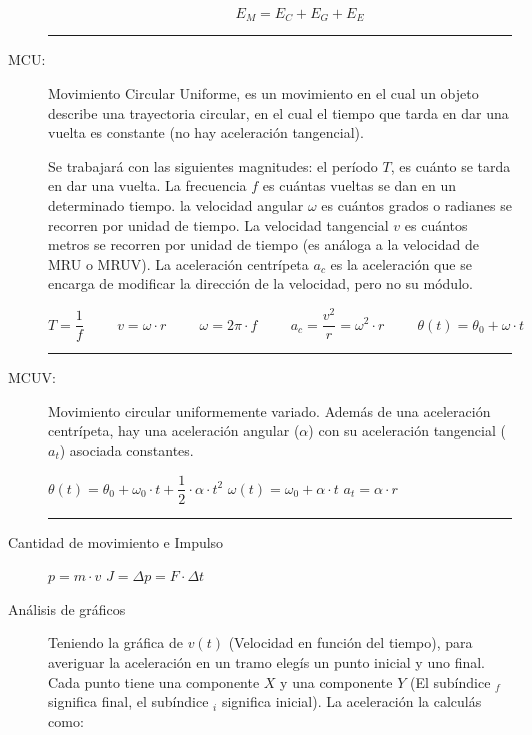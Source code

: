 \begin{description}
\begin{description}
        $$E_M = E_C + E_G + E_E$$
        
    \end{description}
    \hrule 
    \item[MCU:]\hfil

    Movimiento Circular Uniforme, es un movimiento en el cual un objeto describe una trayectoria circular, en el cual el tiempo que tarda en dar una vuelta es constante (no hay aceleración tangencial).

    Se trabajará con las siguientes magnitudes: el período $T$, es cuánto se tarda en dar una vuelta. La frecuencia $f$ es cuántas vueltas se dan en un determinado tiempo. la velocidad angular $\omega$ es cuántos grados o radianes se recorren por unidad de tiempo. La velocidad tangencial $v$ es cuántos metros se recorren por unidad de tiempo (es análoga a la velocidad de MRU o MRUV). La aceleración centrípeta $a_c$ es la aceleración que se encarga de modificar la dirección de la velocidad, pero no su módulo.
    
    $$ T = \dfrac{1}{f}
    \hspace{1cm}
    v = \omega\cdot r
    \hspace{1cm}
    \omega = 2\pi \cdot f
    \hspace{1cm}
    a_c = \dfrac{v^2}{r}=\omega^2\cdot r
    \hspace{1cm}
    \theta (t) = \theta _0 + \omega \cdot t
    $$
    \hrule

    \item[MCUV:]\hfil

    Movimiento circular uniformemente variado. Además de una aceleración centrípeta, hay una aceleración angular ($\alpha$) con su aceleración tangencial ($a_t$) asociada constantes.

    \hfil
    $\theta(t) = \theta_0 + \omega_0 \cdot t + \dfrac{1}{2} \cdot \alpha \cdot t^2$
    \hfil
    $\omega(t) = \omega_0 + \alpha \cdot t$
    \hfil
    $a_t = \alpha \cdot r$
    \hfil
    
    \skipline
    \hrule

    \item[Cantidad de movimiento e Impulso]\hfill

    \hfil$p = m\cdot v$\hfil
    $J=\Delta p = F \cdot \Delta t$
    
    \item[Análisis de gráficos]\hfill
    
    Teniendo la gráfica de $v(t)$ (Velocidad en función del tiempo), para averiguar la aceleración en un tramo elegís un punto inicial y uno final. Cada punto tiene una componente $X$ y una componente $Y$ (El subíndice $_f$ significa final, el subíndice $_i$ significa inicial). La aceleración la calculás como:
    

\end{description}
